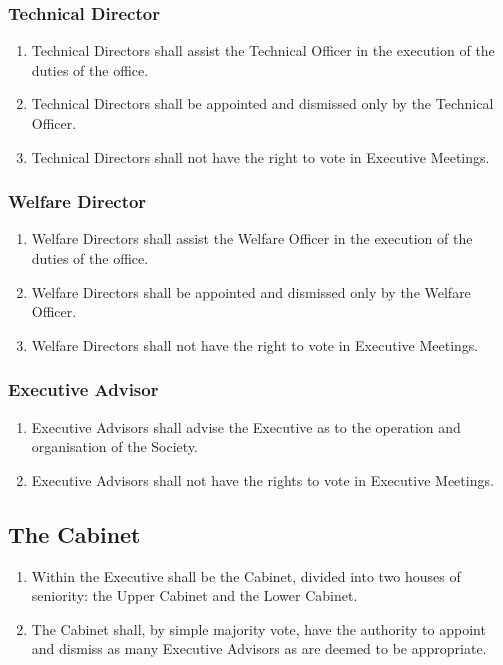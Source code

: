 \documentclass{scrartcl}
\begin{document}
            \subsubsection{Technical Director}
                \label{executive--positions--technical-director}
                \begin{enumerate}
                    \item Technical Directors shall assist the Technical Officer in the execution of the duties of the office.
                    \item Technical Directors shall be appointed and dismissed only by the Technical Officer.
                    \item Technical Directors shall not have the right to vote in Executive Meetings.
                \end{enumerate}

            \subsubsection{Welfare Director}
                \label{executive--positions--welfare-director}
                \begin{enumerate}
                    \item Welfare Directors shall assist the Welfare Officer in the execution of the duties of the office.
                    \item Welfare Directors shall be appointed and dismissed only by the Welfare Officer.
                    \item Welfare Directors shall not have the right to vote in Executive Meetings.
                \end{enumerate}

            \subsubsection{Executive Advisor}
                \label{executive--positions--advisor}
                \begin{enumerate}
                    \item Executive Advisors shall advise the Executive as to the operation and organisation of the Society.
                    \item Executive Advisors shall not have the rights to vote in Executive Meetings.
                \end{enumerate}

        \subsection{The Cabinet}
            \label{executive--cabinet}
            \begin{enumerate}
                \item Within the Executive shall be the Cabinet, divided into two houses of seniority: the Upper Cabinet and the Lower Cabinet.
                \item The Cabinet shall, by simple majority vote, have the authority to appoint and dismiss as many Executive Advisors as are deemed to be appropriate.
            \end{enumerate}
\end{document}
